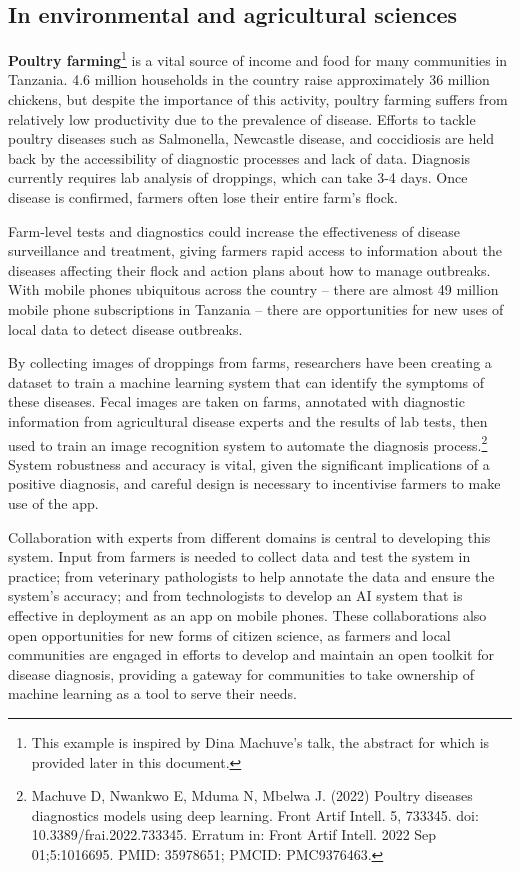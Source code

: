 \hypertarget{in-environmental-and-agricultural-sciences}{%
\subsection{In environmental and agricultural
sciences}\label{in-environmental-and-agricultural-sciences}}

\textbf{Poultry farming}\footnote{This example is inspired by Dina
  Machuve's talk, the abstract for which is provided later in this
  document.} is a vital source of income and food for many communities
in Tanzania. 4.6 million households in the country raise approximately
36 million chickens, but despite the importance of this activity,
poultry farming suffers from relatively low productivity due to the
prevalence of disease. Efforts to tackle poultry diseases such as
Salmonella, Newcastle disease, and coccidiosis are held back by the
accessibility of diagnostic processes and lack of data. Diagnosis
currently requires lab analysis of droppings, which can take 3-4 days.
Once disease is confirmed, farmers often lose their entire farm's flock.

Farm-level tests and diagnostics could increase the effectiveness of
disease surveillance and treatment, giving farmers rapid access to
information about the diseases affecting their flock and action plans
about how to manage outbreaks. With mobile phones ubiquitous across the
country -- there are almost 49 million mobile phone subscriptions in
Tanzania -- there are opportunities for new uses of local data to detect
disease outbreaks.

By collecting images of droppings from farms, researchers have been
creating a dataset to train a machine learning system that can identify
the symptoms of these diseases. Fecal images are taken on farms,
annotated with diagnostic information from agricultural disease experts
and the results of lab tests, then used to train an image recognition
system to automate the diagnosis process.\footnote{Machuve D, Nwankwo E,
  Mduma N, Mbelwa J. (2022) Poultry diseases diagnostics models using
  deep learning. Front Artif Intell. 5, 733345. doi:
  10.3389/frai.2022.733345. Erratum in: Front Artif Intell. 2022 Sep
  01;5:1016695. PMID: 35978651; PMCID: PMC9376463.} System robustness
and accuracy is vital, given the significant implications of a positive
diagnosis, and careful design is necessary to incentivise farmers to
make use of the app.

Collaboration with experts from different domains is central to
developing this system. Input from farmers is needed to collect data and
test the system in practice; from veterinary pathologists to help
annotate the data and ensure the system's accuracy; and from
technologists to develop an AI system that is effective in deployment as
an app on mobile phones. These collaborations also open opportunities
for new forms of citizen science, as farmers and local communities are
engaged in efforts to develop and maintain an open toolkit for disease
diagnosis, providing a gateway for communities to take ownership of
machine learning as a tool to serve their needs.

